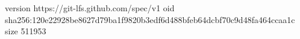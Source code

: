 version https://git-lfs.github.com/spec/v1
oid sha256:120e22928be8627d79ba1f9820b3edf6d488bfeb64dcbf70c9d48fa464ccaa1c
size 511953
